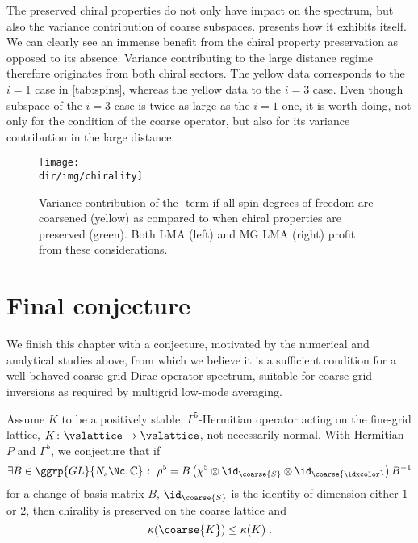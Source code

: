 The preserved chiral properties do not only have impact on the spectrum, but also the variance contribution of coarse subspaces.
 presents how it exhibits itself.
We can clearly see an immense benefit from the chiral property preservation as opposed to its absence.
Variance contributing to the large distance regime therefore originates from both chiral sectors.
The yellow data corresponds to the $i=1$ case in \ref{tab:spins}, whereas the yellow data to the $i=3$ case.
Even though subspace of the $i=3$ case is twice as large as the $i=1$ one, it is worth doing, not only for the condition of the coarse operator, but also for its variance contribution in the large distance.
\begin{figure}
\centering
\texttt{[image: \\dir/img/chirality]}
\caption{
Variance contribution of the -term if all spin degrees of freedom are coarsened (yellow) as compared to when chiral properties are preserved (green).
Both LMA (left) and MG LMA (right) profit from these considerations.
\takenfull
}
\label{fig:chirality:variance}
\end{figure}

\section{Final conjecture}

We finish this chapter with a conjecture, motivated by the numerical and analytical studies above, from which we believe it is a sufficient condition for a well-behaved coarse-grid Dirac operator spectrum, suitable for coarse grid inversions as required by multigrid low-mode averaging.
\begin{conj}
Assume $K$ to be a positively stable, $\Gamma^{5}$-Hermitian operator acting on the fine-grid lattice, $K \colon \vslattice \rightarrow \vslattice$, not necessarily normal.
With Hermitian $P$ and $\Gamma^{5}$, we conjecture that if
\begin{equation} \label{eq:conj:chi}
\exists B \in \ggrp{GL}{N_s \Nc, \mathbb{C}} \; \colon \; \rho^5 = B \left( \chi^{5} \otimes \id_{\coarse{S}} \otimes \id_{\coarse{\idxcolor}} \right) B^{-1}
\end{equation}
for a change-of-basis matrix $B$, $\id_{\coarse{S}}$ is the identity of dimension either $1$ or $2$,
then chirality is preserved on the coarse lattice and
\begin{equation}
\kappa(\coarse{K}) \leq \kappa(K) \;.
\end{equation}
\end{conj}

